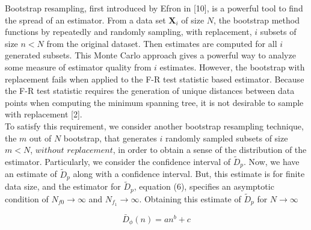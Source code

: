 \documentclass{article}
\begin{document}
	\indent Bootstrap resampling, first introduced by Efron in [10], is a powerful tool to find the spread of an estimator. From a data set $\textbf{X}_i$ of size $N$, the bootstrap method functions by repeatedly and randomly sampling, with replacement, $i$ subsets of size $n<N$ from the original dataset. Then estimates are computed for all $i$ generated subsets. This Monte Carlo approach gives a powerful way to analyze some measure of estimator quality from $i$ estimates. However, the bootstrap with replacement fails when applied to the F-R test statistic based estimator. Because the F-R test statistic requires the generation of unique distances between data points when computing the minimum spanning tree, it is not desirable to sample with replacement [2]. 
	\\ [0.5ex]
	
	\indent To satisfy this requirement, we consider another bootstrap resampling technique, the $m$ out of $N$ bootstrap, that generates $i$ randomly sampled subsets of size $m<N$, $without$ $replacement$, in order to obtain a sense of the distribution of the estimator. Particularly, we consider the confidence interval of $\widetilde{D}_p$. Now, we have an estimate of $\widetilde{D}_p$ along with a confidence interval. But, this estimate is for finite data size, and the estimator for $\widetilde{D}_p$, equation (6), specifies an asymptotic condition of $N_{f0} \rightarrow \infty$ and $N_{f_1} \rightarrow \infty$. Obtaining this estimate of $\widetilde{D}_p$ for $N \rightarrow \infty$ 
	\\ [0.5ex]
	
	\indent 

	\begin{equation}
	\bar{D}_\phi(n)=an^b+c
	\end{equation}
	
\end{document}
